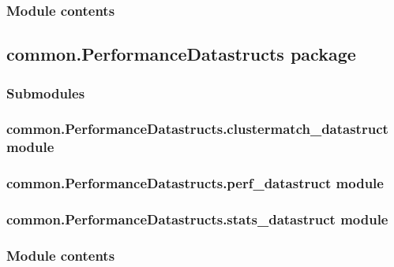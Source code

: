 \documentclass[letterpaper,10pt,english]{sphinxmanual}
\begin{document}
\subsubsection{Module contents}
\label{\detokenize{common.ParametersExplorer:module-common.ParametersExplorer}}\label{\detokenize{common.ParametersExplorer:module-contents}}

\subsection{common.PerformanceDatastructs package}
\label{\detokenize{common.PerformanceDatastructs:common-performancedatastructs-package}}\label{\detokenize{common.PerformanceDatastructs::doc}}

\subsubsection{Submodules}
\label{\detokenize{common.PerformanceDatastructs:submodules}}

\subsubsection{common.PerformanceDatastructs.clustermatch\_datastruct module}
\label{\detokenize{common.PerformanceDatastructs:common-performancedatastructs-clustermatch-datastruct-module}}

\subsubsection{common.PerformanceDatastructs.perf\_datastruct module}
\label{\detokenize{common.PerformanceDatastructs:common-performancedatastructs-perf-datastruct-module}}

\subsubsection{common.PerformanceDatastructs.stats\_datastruct module}
\label{\detokenize{common.PerformanceDatastructs:common-performancedatastructs-stats-datastruct-module}}

\subsubsection{Module contents}
\label{\detokenize{common.PerformanceDatastructs:module-common.PerformanceDatastructs}}\label{\detokenize{common.PerformanceDatastructs:module-contents}}
\end{document}
